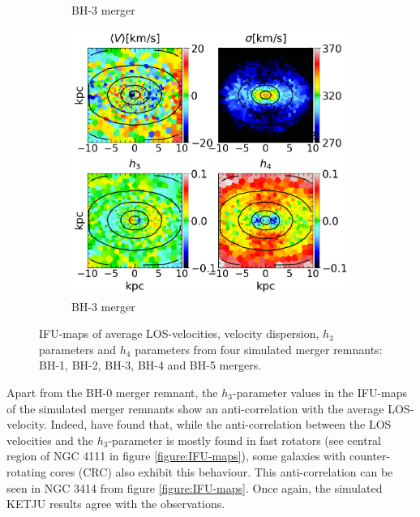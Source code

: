 \documentclass[english, oneside]{HYgradu}
\begin{document}
\begin{figure}
\begin{subfigure}[b]{0.49\textwidth}
		\caption{BH-3 merger}
	\end{subfigure}
	\begin{subfigure}[b]{0.49\textwidth}
		\includegraphics[width=\textwidth]{BH_5.png}
		\caption{BH-3 merger}
	\end{subfigure}
	\caption{IFU-maps of average LOS-velocities, velocity dispersion, $h_3$ parameters and $h_4$ parameters from four simulated merger remnants: BH-1, BH-2, BH-3, BH-4 and BH-5 mergers.}
	\label{figure:rest_of_voronoi}
\end{figure}



Apart from the BH-0 merger remnant, the $h_3$-parameter values in the IFU-maps of the simulated merger remnants show an anti-correlation with the average LOS-velocity. Indeed, \cite{Krajnovic2011} have found that, while the anti-correlation between the LOS velocities and the $h_3$-parameter is mostly found in fast rotators (see central region of NGC 4111 in figure \ref{figure:IFU-maps}), some galaxies with counter-rotating cores (CRC) also exhibit this behaviour. This anti-correlation can be seen in NGC 3414 from figure \ref{figure:IFU-maps}. Once again, the simulated KETJU results agree with the observations.
\end{document}
